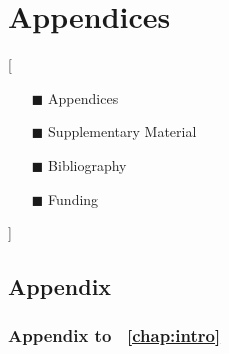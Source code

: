 \part{Appendices}[
\vspace{1cm}
\begin{center}
\begin{minipage}{0.5\textwidth}
\small{
\begin{enumerate}
\item[$\blacksquare$] Appendices
\item[$\blacksquare$] Supplementary Material
\item[$\blacksquare$] Bibliography
\item[$\blacksquare$] Funding
\end{enumerate}
}
\end{minipage}
\end{center}

]


\clearpage
\chapter{Appendix}
\label{chap:app}

\clearpage
\section{Appendix to \chap\ \ref{chap:intro}}
\label{sec:appchap1}


\afterpage{\blankpage}
